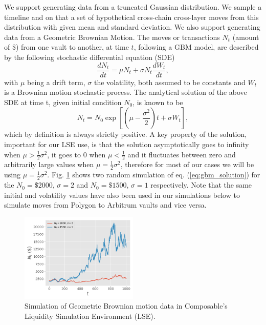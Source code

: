 We support generating data from a truncated Gaussian distribution. We sample a timeline and on that a set of hypothetical cross-chain cross-layer moves from this distribution with given mean and standard deviation.
%
We also support generating data from a Geometric Brownian Motion.
%
The moves or transactions $N_t$ (amount of \$) from one vault to another, at time $t$, following a GBM model, are described by the following stochastic differential equation (SDE)
\begin{equation}
\frac{d N_t}{dt} = \mu N_t + \sigma N_t\frac{dW_t}{dt}, 
\end{equation}
with $\mu$ being a drift term, $\sigma$ the volatility, both assumed to be constants and $W_t$ is a Brownian motion stochastic process. The analytical solution of the above SDE at time t, given initial condition $N_0$, is known to be 
\begin{equation}
\label{eq:gbm_solution}
N_t = N_0 \exp\left[ \left(\mu - \frac{\sigma^2}{2}\right) t + \sigma W_t\right],
\end{equation}
which by definition is always strictly positive. A key property of the solution, important for our LSE use, is that the solution asymptotically goes to infinity when $\mu > \frac{1}{2}\sigma^2$, it goes to $0$ when $\mu < \frac{1}{2}$ and it fluctuates between zero and arbitrarily large values when $\mu = \frac{1}{2}\sigma^2$, therefore for most of our cases we will be using $\mu = \frac{1}{2}\sigma^2$. Fig. \ref{fig:gbm} shows two random simulation of eq. (\ref{eq:gbm_solution}) for the $N_0 = \$2000$, $\sigma=2$ and $N_0=\$1500$, $\sigma=1$ respectively. Note that the same initial and volatility values have also been used in our simulations below to simulate moves from Polygon to Arbitrum vaults and vice versa.
%
\begin{figure}[h]
    \centering
    \includegraphics[width=0.5\textwidth]{images/gbms.png}
    \caption{Simulation of Geometric Brownian motion data in Composable's Liquidity Simulation Environment (LSE).}
    \label{fig:gbm}
\end{figure}
%

